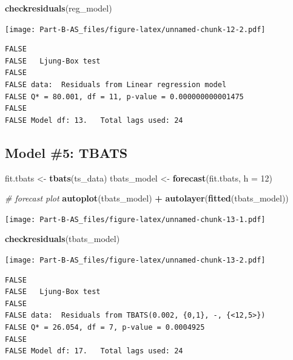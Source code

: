\documentclass[openany]{book}
\newenvironment{Shaded}{\begin{snugshade}}{\end{snugshade}}
\newcommand{\KeywordTok}[1]{\textcolor[rgb]{0.13,0.29,0.53}{\textbf{#1}}}
\newcommand{\DataTypeTok}[1]{\textcolor[rgb]{0.13,0.29,0.53}{#1}}
\newcommand{\DecValTok}[1]{\textcolor[rgb]{0.00,0.00,0.81}{#1}}
\newcommand{\StringTok}[1]{\textcolor[rgb]{0.31,0.60,0.02}{#1}}
\newcommand{\CommentTok}[1]{\textcolor[rgb]{0.56,0.35,0.01}{\textit{#1}}}
\newcommand{\OperatorTok}[1]{\textcolor[rgb]{0.81,0.36,0.00}{\textbf{#1}}}
\newcommand{\NormalTok}[1]{#1}
\begin{document}
\begin{Shaded}
\begin{Highlighting}[]
\KeywordTok{checkresiduals}\NormalTok{(reg_model)}
\end{Highlighting}
\end{Shaded}

\texttt{[image: Part-B-AS\_files/figure-latex/unnamed-chunk-12-2.pdf]}

\begin{verbatim}
FALSE 
FALSE   Ljung-Box test
FALSE 
FALSE data:  Residuals from Linear regression model
FALSE Q* = 80.001, df = 11, p-value = 0.000000000001475
FALSE 
FALSE Model df: 13.   Total lags used: 24
\end{verbatim}

\subsection{Model \#5: TBATS}\label{model-5-tbats}

\begin{Shaded}
\begin{Highlighting}[]
\NormalTok{fit.tbats <-}\StringTok{ }\KeywordTok{tbats}\NormalTok{(ts_data)}
\NormalTok{tbats_model <-}\StringTok{ }\KeywordTok{forecast}\NormalTok{(fit.tbats, }\DataTypeTok{h =} \DecValTok{12}\NormalTok{)}

\CommentTok{# forecast plot}
\KeywordTok{autoplot}\NormalTok{(tbats_model) }\OperatorTok{+}\StringTok{ }\KeywordTok{autolayer}\NormalTok{(}\KeywordTok{fitted}\NormalTok{(tbats_model))}
\end{Highlighting}
\end{Shaded}

\texttt{[image: Part-B-AS\_files/figure-latex/unnamed-chunk-13-1.pdf]}

\begin{Shaded}
\begin{Highlighting}[]
\KeywordTok{checkresiduals}\NormalTok{(tbats_model)}
\end{Highlighting}
\end{Shaded}

\texttt{[image: Part-B-AS\_files/figure-latex/unnamed-chunk-13-2.pdf]}

\begin{verbatim}
FALSE 
FALSE   Ljung-Box test
FALSE 
FALSE data:  Residuals from TBATS(0.002, {0,1}, -, {<12,5>})
FALSE Q* = 26.054, df = 7, p-value = 0.0004925
FALSE 
FALSE Model df: 17.   Total lags used: 24
\end{verbatim}
\end{document}
